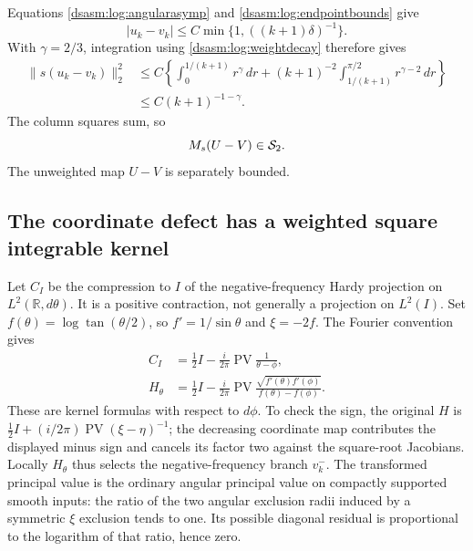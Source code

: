 \documentclass[11pt,letterpaper]{article}
\theoremstyle{remark}\newtheorem{remark}[theorem]{Remark}
\newcommand{\R}{\mathbb R}\newcommand{\C}{\mathbb C}\newcommand{\N}{\mathbb N}
\DeclareMathOperator{\PV}{PV}\DeclareMathOperator{\sym}{sym}
\begin{document}
Equations \eqref{dsasm:log:angularasymp} and \eqref{dsasm:log:endpointbounds} give
\[
 |u_k-v_k|\le C\min\{1,((k+1)\delta)^{-1}\}.
\]
With $\gamma=2/3$, integration using \eqref{dsasm:log:weightdecay}
therefore gives
\begin{align*}
 \|s(u_k-v_k)\|_2^2
 &\le C\left\{\int_0^{1/(k+1)}r^\gamma\,dr
 +(k+1)^{-2}\int_{1/(k+1)}^{\pi/2}r^{\gamma-2}\,dr\right\}\\
 &\le C(k+1)^{-1-\gamma}.
\end{align*}
The column squares sum, so
\begin{equation}\label{dsasm:log:weightedUV}
 M_s(U-V)\in\mathcal S_2.
\end{equation}
The unweighted map $U-V$ is separately bounded.

\subsection{The coordinate defect has a weighted square integrable kernel}
Let $C_I$ be the compression to $I$ of the negative-frequency
Hardy projection on $L^2(\R,d\theta)$. It is a positive contraction,
not generally a projection on $L^2(I)$. Set
$f(\theta)=\log\tan(\theta/2)$, so $f'=1/\sin\theta$ and
$\xi=-2f$. The Fourier convention gives
\begin{equation}\label{dsasm:log:Hardykernels}
\begin{split}
 C_I&=\tfrac12 I-\frac{i}{2\pi}\PV\frac1{\theta-\phi},\\
 H_\theta&=\tfrac12 I-\frac{i}{2\pi}\PV
 \frac{\sqrt{f'(\theta)f'(\phi)}}{f(\theta)-f(\phi)}.
\end{split}
\end{equation}
These are kernel formulas with respect to $d\phi$. To check the
sign, the original $H$ is
$\tfrac12I+(i/2\pi)\PV(\xi-\eta)^{-1}$; the decreasing coordinate
map contributes the displayed minus sign and cancels its factor two
against the square-root Jacobians. Locally $H_\theta$ thus selects
the negative-frequency branch $v_k^-$.
The transformed principal value is the ordinary angular principal
value on compactly supported smooth inputs: the ratio of the two
angular exclusion radii induced by a symmetric $\xi$ exclusion tends
to one. Its possible diagonal residual is proportional to the
logarithm of that ratio, hence zero.
\end{document}
